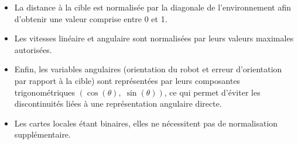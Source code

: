 \begin{itemize}
    \item La distance à la cible est normalisée par la diagonale de l'environnement afin d'obtenir une valeur comprise entre 0 et 1.

    \item Les vitesses linéaire et angulaire sont normalisées par leurs valeurs maximales autorisées.

    \item Enfin, les variables angulaires (orientation du robot et erreur d'orientation par rapport à la cible) sont représentées par leurs composantes trigonométriques $(\cos (\theta), \; \sin (\theta))$, ce qui permet d'éviter les discontinuités liées à une représentation angulaire directe.

    \item Les cartes locales étant binaires, elles ne nécessitent pas de normalisation supplémentaire.
\end{itemize}
